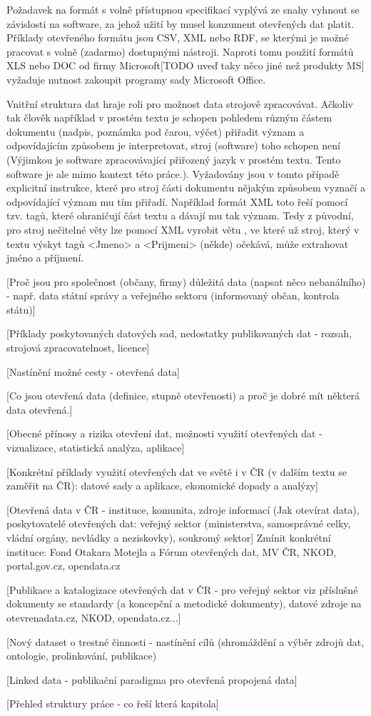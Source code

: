 Požadavek na formát s volně přístupnou specifikací vyplývá ze snahy vyhnout se závislosti na software, za jehož užití by musel konzument otevřených dat platit. Příklady otevřeného formátu jsou CSV, XML nebo RDF, se kterými je možné pracovat s volně (zadarmo) dostupnými nástroji. Naproti tomu použití formátů XLS nebo DOC od firmy Microsoft[TODO uveď taky něco jiné než produkty MS] vyžaduje nutnost zakoupit programy sady Microsoft Office.

Vnitřní struktura dat hraje roli pro možnost data strojově zpracovávat. Ačkoliv tak člověk například v prostém textu je schopen pohledem různým částem dokumentu (nadpis, poznámka pod čarou, výčet) přiřadit význam a odpovídajícím způsobem je interpretovat, stroj (software) toho schopen není (Výjimkou je software zpracovávající přiřozený jazyk v prostém textu. Tento software je ale mimo kontext této práce.). Vyžadovány jsou v tomto případě explicitní instrukce, které pro stroj části dokumentu nějakým způsobem vyznačí a odpovídající význam mu tím přiřadí. Například formát XML toto řeší pomocí tzv. tagů, které ohraničují část textu a dávají mu tak význam. Tedy z původní, pro stroj nečitelné věty  lze pomocí XML vyrobit větu , ve které už stroj, který v textu výskyt tagů <Jmeno> a <Prijmeni> (někde) očekává, může extrahovat jméno a příjmení.

[Proč jsou pro společnost (občany, firmy) důležitá data (napsat něco nebanálního) - např. data státní správy a veřejného sektoru (informovaný občan, kontrola státu)]

[Příklady poskytovaných datových sad, nedostatky publikovaných dat - rozsah, strojová zpracovatelnost, licence]

[Nastínění možné cesty - otevřená data]

[Co jsou otevřená data (definice, stupně otevřenosti) a proč je dobré mít některá data otevřená.]

[Obecné přínosy a rizika otevření dat, možnosti využití otevřených dat - vizualizace, statistická analýza, aplikace]

[Konkrétní příklady využití otevřených dat ve světě i v ČR (v dalším textu se zaměřit na ČR): datové sady a aplikace, ekonomické dopady a analýzy]

[Otevřená data v ČR - instituce, komunita, zdroje informací (Jak otevírat data), poskytovatelé otevřených dat: veřejný sektor (ministerstva, samosprávné celky, vládní orgány, nevládky a neziskovky), soukromý sektor]
Zmínit konkrétní instituce: Fond Otakara Motejla a Fórum otevřených dat, MV ČR, NKOD, portal.gov.cz, opendata.cz

[Publikace a katalogizace otevřených dat v ČR - pro veřejný sektor viz příslušné dokumenty se standardy (a koncepční a metodické dokumenty), datové zdroje na otevrenadata.cz, NKOD, opendata.cz...]

[Nový dataset o trestné činnosti - nastínění cílů (shromáždění a výběr zdrojů dat, ontologie, prolinkování, publikace)

[Linked data - publikační paradigma pro otevřená propojená data]

[Přehled struktury práce - co řeší která kapitola]

